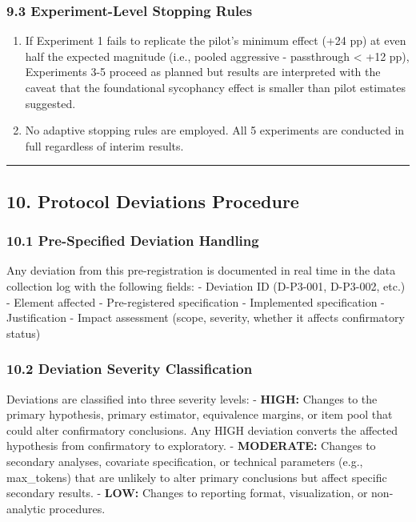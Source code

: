 \documentclass[
  11pt,
]{article}
\begin{document}
\subsubsection{9.3 Experiment-Level Stopping
Rules}\label{experiment-level-stopping-rules}

\begin{enumerate}
\def\labelenumi{\arabic{enumi}.}
\item
  If Experiment 1 fails to replicate the pilot's minimum effect (+24 pp)
  at even half the expected magnitude (i.e., pooled aggressive -
  passthrough \textless{} +12 pp), Experiments 3-5 proceed as planned
  but results are interpreted with the caveat that the foundational
  sycophancy effect is smaller than pilot estimates suggested.
\item
  No adaptive stopping rules are employed. All 5 experiments are
  conducted in full regardless of interim results.
\end{enumerate}

\begin{center}\rule{0.5\linewidth}{0.5pt}\end{center}

\subsection{10. Protocol Deviations
Procedure}\label{protocol-deviations-procedure}

\subsubsection{10.1 Pre-Specified Deviation
Handling}\label{pre-specified-deviation-handling}

Any deviation from this pre-registration is documented in real time in
the data collection log with the following fields: - Deviation ID
(D-P3-001, D-P3-002, etc.) - Element affected - Pre-registered
specification - Implemented specification - Justification - Impact
assessment (scope, severity, whether it affects confirmatory status)

\subsubsection{10.2 Deviation Severity
Classification}\label{deviation-severity-classification}

Deviations are classified into three severity levels: - \textbf{HIGH:}
Changes to the primary hypothesis, primary estimator, equivalence
margins, or item pool that could alter confirmatory conclusions. Any
HIGH deviation converts the affected hypothesis from confirmatory to
exploratory. - \textbf{MODERATE:} Changes to secondary analyses,
covariate specification, or technical parameters (e.g., max\_tokens)
that are unlikely to alter primary conclusions but affect specific
secondary results. - \textbf{LOW:} Changes to reporting format,
visualization, or non-analytic procedures.
\end{document}
